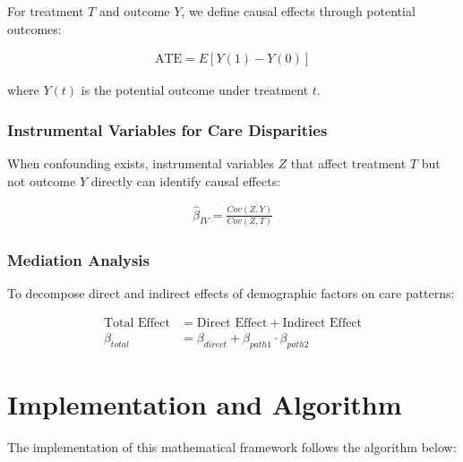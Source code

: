 \documentclass[12pt]{article}
\begin{document}
For treatment $T$ and outcome $Y$, we define causal effects through potential outcomes:

\begin{align}
\text{ATE} = E[Y(1) - Y(0)]
\end{align}

where $Y(t)$ is the potential outcome under treatment $t$.

\subsubsection{Instrumental Variables for Care Disparities}

When confounding exists, instrumental variables $Z$ that affect treatment $T$ but not outcome $Y$ directly can identify causal effects:

\begin{align}
\hat{\beta}_{IV} = \frac{Cov(Z,Y)}{Cov(Z,T)}
\end{align}

\subsubsection{Mediation Analysis}

To decompose direct and indirect effects of demographic factors on care patterns:

\begin{align}
\text{Total Effect} &= \text{Direct Effect} + \text{Indirect Effect}\\
\beta_{total} &= \beta_{direct} + \beta_{path1} \cdot \beta_{path2}
\end{align}

\section{Implementation and Algorithm}

The implementation of this mathematical framework follows the algorithm below:
\end{document}
